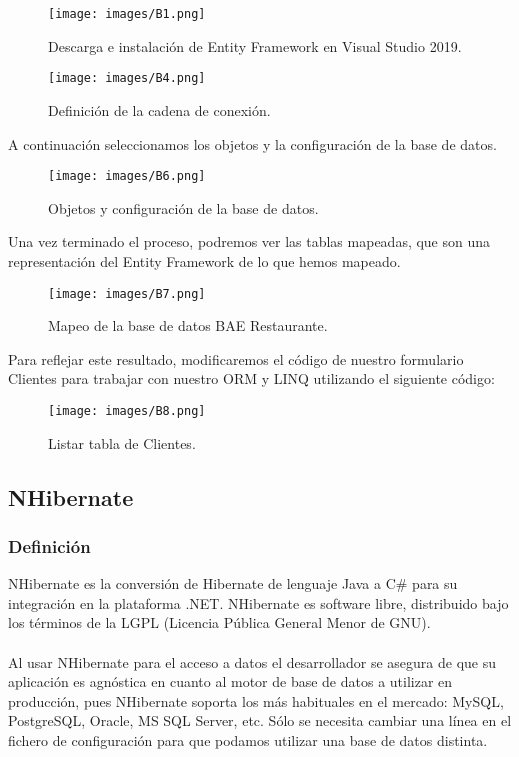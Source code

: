 \documentclass{article}
\begin{document}
\begin{figure}[ht]
    \centering     
    \texttt{[image: images/B1.png]}
    \caption{Descarga e instalación de Entity Framework en Visual Studio 2019.}
    \label{fig:BiasVoltage}
\end{figure}
\begin{figure}[ht]
    \centering     
    \texttt{[image: images/B4.png]}
    \caption{Definición de la cadena de conexión.}
    \label{fig:BiasVoltage}
\end{figure}
A continuación seleccionamos los objetos y la configuración de la base de datos.
\begin{figure}[ht]
    \centering     
    \texttt{[image: images/B6.png]}
    \caption{Objetos y configuración de la base de datos.}
    \label{fig:BiasVoltage}
\end{figure}

Una vez terminado el proceso, podremos ver las tablas mapeadas, que son una representación del Entity Framework de lo que hemos mapeado.
\begin{figure}[ht]
    \centering     
    \texttt{[image: images/B7.png]}
    \caption{Mapeo de la base de datos BAE Restaurante.}
    \label{fig:BiasVoltage}
\end{figure}

Para reflejar este resultado, modificaremos el código de nuestro formulario Clientes para trabajar con nuestro ORM y LINQ utilizando el siguiente código:
\newpage
\begin{figure}[ht]
    \centering     
    \texttt{[image: images/B8.png]}
    \caption{Listar tabla de Clientes.}
    \label{fig:BiasVoltage}
\end{figure}
\subsection{NHibernate }
\subsubsection{Definición}
NHibernate es la conversión de Hibernate de lenguaje Java a C# para su integración en la plataforma .NET. NHibernate es software libre, distribuido bajo los términos de la LGPL (Licencia Pública General Menor de GNU).
\\\\Al usar NHibernate para el acceso a datos el desarrollador se asegura de que su aplicación es agnóstica en cuanto al motor de base de datos a utilizar en producción, pues NHibernate soporta los más habituales en el mercado: MySQL, PostgreSQL, Oracle, MS SQL Server, etc. Sólo se necesita cambiar una línea en el fichero de configuración para que podamos utilizar una base de datos distinta.
\end{document}
